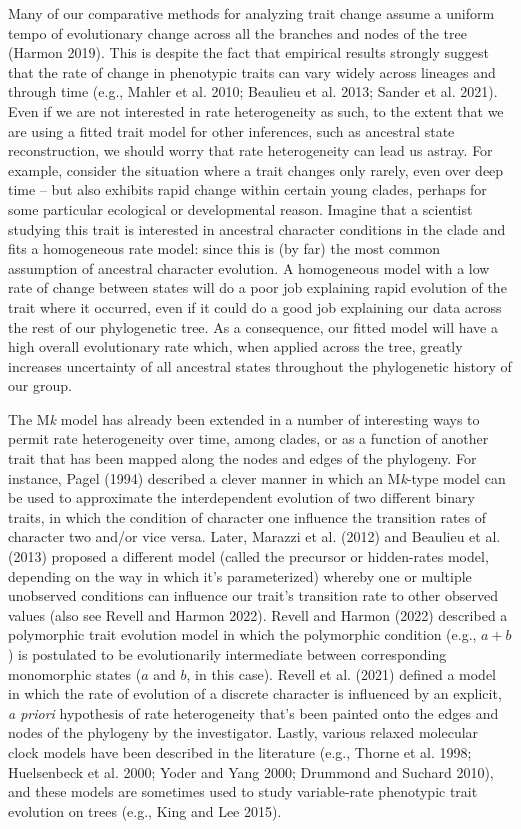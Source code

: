 \documentclass[fleqn,10pt,lineno]{wlpeerj} %
\begin{document}
Many of our comparative methods for analyzing trait change assume a uniform tempo of evolutionary change across all the branches and nodes of the tree (Harmon 2019). This is despite the fact that empirical results strongly suggest that the rate of change in phenotypic traits can vary widely across lineages and through time (e.g., Mahler et al. 2010; Beaulieu et al. 2013; Sander et al. 2021). Even if we are not interested in rate heterogeneity as such, to the extent that we are using a fitted trait model for other inferences, such as ancestral state reconstruction, we should worry that rate heterogeneity can lead us astray. For example, consider the situation where a trait changes only rarely, even over deep time -- but also exhibits rapid change within certain young clades, perhaps for some particular ecological or developmental reason. Imagine that a scientist studying this trait is interested in ancestral character conditions in the clade and fits a homogeneous rate model: since this is (by far) the most common assumption of ancestral character evolution. A homogeneous model with a low rate of change between states will do a poor job explaining rapid evolution of the trait where it occurred, even if it could do a good job explaining our data across the rest of our phylogenetic tree. As a consequence, our fitted model will have a high overall evolutionary rate which, when applied across the tree, greatly increases uncertainty of all ancestral states throughout the phylogenetic history of our group.

The M\emph{k} model has already been extended in a number of interesting ways to permit rate heterogeneity over time, among clades, or as a function of another trait that has been mapped along the nodes and edges of the phylogeny. For instance, Pagel (1994) described a clever manner in which an M\emph{k}-type model can be used to approximate the interdependent evolution of two different binary traits, in which the condition of character one influence the transition rates of character two and/or vice versa. Later, Marazzi et al. (2012) and Beaulieu et al. (2013) proposed a different model (called the precursor or hidden-rates model, depending on the way in which it's parameterized) whereby one or multiple unobserved conditions can influence our trait's transition rate to other observed values (also see Revell and Harmon 2022). Revell and Harmon (2022) described a polymorphic trait evolution model in which the polymorphic condition (e.g., \(a + b\)) is postulated to be evolutionarily intermediate between corresponding monomorphic states (\(a\) and \(b\), in this case). Revell et al. (2021) defined a model in which the rate of evolution of a discrete character is influenced by an explicit, \emph{a priori} hypothesis of rate heterogeneity that's been painted onto the edges and nodes of the phylogeny by the investigator. Lastly, various relaxed molecular clock models have been described in the literature (e.g., Thorne et al. 1998; Huelsenbeck et al. 2000; Yoder and Yang 2000; Drummond and Suchard 2010), and these models are sometimes used to study variable-rate phenotypic trait evolution on trees (e.g., King and Lee 2015).
\end{document}
